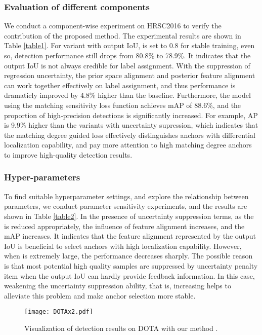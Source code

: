 \documentclass[letterpaper]{article} \usepackage{aaai21}  \usepackage{times}  \usepackage{helvet} \usepackage{courier}  \usepackage[hyphens]{url}  \usepackage{graphicx} \urlstyle{rm} \def\UrlFont{\rm}  \usepackage{natbib}  \usepackage{caption} \frenchspacing  \setlength{\pdfpagewidth}{8.5in}  \setlength{\pdfpageheight}{11in}  \usepackage{url}
\begin{document}
\subsubsection{Evaluation of different components}
We conduct a component-wise experiment on HRSC2016 to verify the contribution of the proposed method. The experimental results are shown in Table \ref{table1}. For variant with output IoU,   is set to 0.8 for stable training, even so, detection performance still drops from 80.8\% to 78.9\%. It indicates that the output IoU is not always credible for label assignment. With the suppression of regression uncertainty, the prior space alignment and posterior feature alignment can work together effectively on label assignment, and thus performance is dramaticly improved by 4.8\% higher than the baseline. Furthermore, the model using the matching sensitivity loss function achieves mAP of 88.6\%, and the proportion of high-precision detections is significantly increased. For example, AP is 9.9\% higher than the variants with uncertainty supression, which indicates that the matching degree guided loss effectively distinguishes anchors with differential localization capability, and pay more attention to high matching degree anchors to improve high-quality detection results.
\subsubsection{Hyper-parameters}
To find suitable hyperparameter settings, and explore the relationship between parameters, we conduct parameter sensitivity experiments, and the results are shown in Table \ref{table2}. In the presence of uncertainty suppression terms, as the  is  reduced appropriately, the influence of feature alignment increases, and the mAP increases. It indicates that the feature alignment represented by the output IoU is beneficial to select anchors with high localization capability. However, when  is extremely large, the performance decreases sharply. The possible reason is that most potential high quality samples are suppressed by uncertainty penalty item when the output IoU can hardly provide feedback information. In this case, weakening the uncertainty suppression ability, that is, increasing  helps  to alleviate this problem and make anchor selection more stable.
\begin{figure*}[t]
	\centering
	\texttt{[image: DOTAx2.pdf]} \caption{ Visualization of detection results on DOTA with our method . }
	\label{fig4}
\end{figure*}
\end{document}
